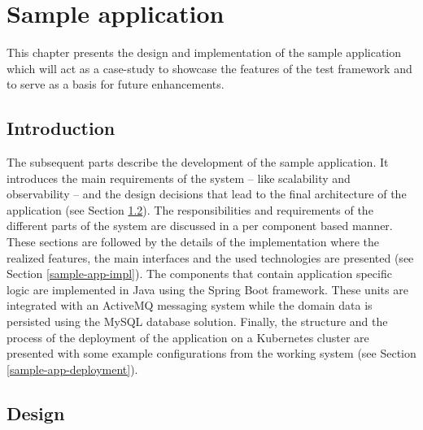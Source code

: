\chapter{Sample application} \label{sample-app}

This chapter presents the design and implementation of the sample application which will act as a case-study to showcase the features of the test framework and to serve as a basis for future enhancements.

\section{Introduction} \label{sample-app-intro}

The subsequent parts describe the development of the sample application. It introduces the main requirements of the system -- like scalability and observability --  and the design decisions that lead to the final architecture of the application (see Section \ref{design}). The responsibilities and requirements of the different parts of the system are discussed in a per component based manner. These sections are followed by the details of the implementation where the realized features, the main interfaces and the used technologies are presented (see Section \ref{sample-app-impl}). The components that contain application specific logic are implemented in Java using the Spring Boot framework. These units are integrated with an ActiveMQ messaging system while the domain data is persisted using the MySQL database solution.  Finally, the structure and the process of the deployment of the application on a Kubernetes cluster are presented with some example configurations from the working system (see Section \ref{sample-app-deployment}).


\section{Design} \label{design}

